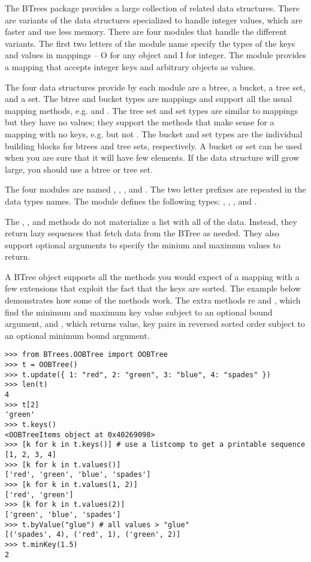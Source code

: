 The BTrees package provides a large collection of related data
structures.  There are variants of the data structures specialized to
handle integer values, which are faster and use less memory.  There
are four modules that handle the different variants.  The first two
letters of the module name specify the types of the keys and values in
mappings -- O for any object and I for integer.  The
 module provides a mapping that accepts integer
keys and arbitrary objects as values.

The four data structures provide by each module are a btree, a bucket,
a tree set, and a set.  The btree and bucket types are mappings and
support all the usual mapping methods, e.g.  and
.  The tree set and set types are similar to mappings
but they have no values; they support the methods that make sense for
a mapping with no keys, e.g.  but not
.  The bucket and set types are the individual
building blocks for btrees and tree sets, respectively.  A bucket or
set can be used when you are sure that it will have few elements.  If
the data structure will grow large, you should use a btree or tree
set.

The four modules are named , ,
, and .  The two letter prefixes are
repeated in the data types names.  The  module
defines the following types: , ,
, and .

The , , and 
methods do not materialize a list with all of the data.  Instead, they
return lazy sequences that fetch data from the BTree as needed.  They
also support optional arguments to specify the minium and maximum
values to return.

A BTree object supports all the methods you would expect of a mapping
with a few extensions that exploit the fact that the keys are sorted.
The example below demonstrates how some of the methods work.  The
extra methods re  and , which
find the minimum and maximum key value subject to an optional bound
argument, and , which returns value, key pairs
in reversed sorted order subject to an optional minimum bound argument.

\begin{verbatim}
>>> from BTrees.OOBTree import OOBTree
>>> t = OOBTree()
>>> t.update({ 1: "red", 2: "green", 3: "blue", 4: "spades" })
>>> len(t)
4
>>> t[2]
'green'
>>> t.keys()
<OOBTreeItems object at 0x40269098>
>>> [k for k in t.keys()] # use a listcomp to get a printable sequence
[1, 2, 3, 4]
>>> [k for k in t.values()]
['red', 'green', 'blue', 'spades']
>>> [k for k in t.values(1, 2)]
['red', 'green']
>>> [k for k in t.values(2)]
['green', 'blue', 'spades']
>>> t.byValue("glue") # all values > "glue"
[('spades', 4), ('red', 1), ('green', 2)]
>>> t.minKey(1.5)
2
\end{verbatim}

